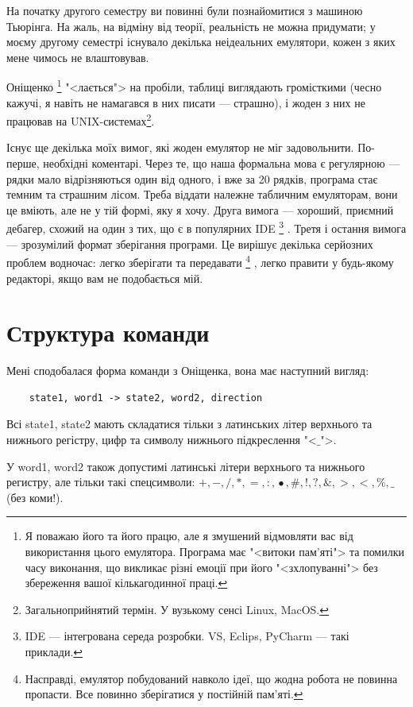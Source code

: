 \documentclass[oneside,final,14pt]{extreport}
\begin{document}
На початку другого семестру ви повинні були познайомитися з машиною Тьюрінга. На жаль, на відміну від теорії, реальність не можна придумати; у моєму другому семестрі існувало декілька неідеальних емулятори, кожен з яких мене чимось не влаштовував. 

Оніщенко
\footnote{Я поважаю його та його працю, але я змушений відмовляти вас від використання цього емулятора. Програма має "<витоки пам'яті"> та помилки часу виконання, що викликає різні емоції при його "<зхлопуванні"> без збереження вашої кількагодинної праці.}
 "<лається"> на пробіли, таблиці виглядають громісткими (чесно кажучі, я навіть не намагався в них писати --- страшно), і жоден з них не працював на UNIX-системах\footnote{Загальноприйнятий термін. У вузькому сенсі Linux, MacOS.}.

Існує ще декілька моїх вимог, які жоден емулятор не міг задовольнити. По-перше, необхідні коментарі. Через те, що наша формальна мова є регулярною  --- рядки мало відрізняються один від одного, і вже за 20 рядків, програма стає темним та страшним лісом. Треба віддати належне табличним емуляторам, вони це вміють, але не у тій формі, яку я хочу.
Друга вимога --- хороший, приємний дебагер, схожий на один з тих, що є в популярних IDE
\footnote{IDE --- інтегрована середа розробки. VS, Eclips, PyCharm --- такі приклади.}
. Третя і остання вимога --- зрозумілий формат зберігання програми. Це вирішує декілька серйозних проблем водночас: легко зберігати та передавати
\footnote{Насправді, емулятор побудований навколо ідеї, що жодна робота не повинна пропасти. Все повинно зберігатися у постійній пам'яті.}
, легко правити у будь-якому редакторі, якщо вам не подобається мій.

\section{Структура команди}

Мені сподобалася форма команди з Оніщенка, вона має наступний вигляд:

\begin{verbatim}
	state1, word1 -> state2, word2, direction
\end{verbatim}

Всі state1, state2 мають складатися тільки з латинських літер верхнього та нижнього регістру, цифр та символу нижнього підкреслення "<$\_$">.
		
У word1, word2 також допустимі латинські літери верхнього та нижнього регистру, але тільки такі спецсимволи: $+,-,/,*,=,:,\hat{•},\#,!,?,\&,>,<,\%,\_$\\ (без коми!). 
		
\end{document}
